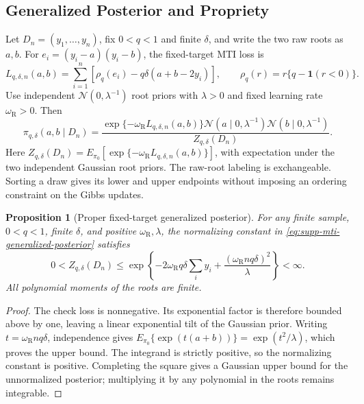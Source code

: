 \documentclass[11pt]{article}
\newcommand{\Normal}{\mathcal{N}}
\newcommand{\ind}{\mathbf{1}}
\newtheorem{proposition}{Proposition}
\begin{document}
\subsection{Generalized Posterior and Propriety}
\label{sec:supp-mti-posterior}

Let \(D_n=(y_1,\ldots,y_n)\), fix \(0<q<1\) and finite \(\delta\), and
write the two raw roots as \(a,b\). For \(e_i=(y_i-a)(y_i-b)\), the
fixed-target MTI loss is
\begin{equation}
L_{q,\delta,n}(a,b)
=\sum_{i=1}^n\left[
\rho_q(e_i)-q\delta(a+b-2y_i)
\right],
\qquad
\rho_q(r)=r\{q-\ind(r<0)\}.
\label{eq:supp-mti-computational-loss}
\end{equation}
Use independent \(\Normal(0,\lambda^{-1})\) root priors with
\(\lambda>0\) and fixed learning rate \(\omega_{\mathrm R}>0\). Then
\begin{equation}
\pi_{q,\delta}(a,b\mid D_n)
=\frac{\exp\{-\omega_{\mathrm R}L_{q,\delta,n}(a,b)\}
\Normal(a\mid0,\lambda^{-1})\Normal(b\mid0,\lambda^{-1})}
{Z_{q,\delta}(D_n)}.
\label{eq:supp-mti-generalized-posterior}
\end{equation}
Here \(Z_{q,\delta}(D_n)=E_{\pi_0}
[\exp\{-\omega_{\mathrm R}L_{q,\delta,n}(a,b)\}]\), with expectation under
the two independent Gaussian root priors.
The raw-root labeling is exchangeable. Sorting a draw gives its lower and
upper endpoints without imposing an ordering constraint on the Gibbs updates.

\begin{proposition}[Proper fixed-target generalized posterior]
\label{prop:supp-mti-posterior-proper}
For any finite sample, \(0<q<1\), finite \(\delta\), and positive
\(\omega_{\mathrm R},\lambda\), the normalizing constant in
\eqref{eq:supp-mti-generalized-posterior} satisfies
\[
0<Z_{q,\delta}(D_n)
\le\exp\left\{-2\omega_{\mathrm R}q\delta\sum_i y_i
+\frac{(\omega_{\mathrm R}nq\delta)^2}{\lambda}\right\}<\infty.
\]
All polynomial moments of the roots are finite.
\end{proposition}

\begin{proof}
The check loss is nonnegative. Its exponential factor is therefore bounded
above by one, leaving a linear exponential tilt of the Gaussian prior.
Writing \(t=\omega_{\mathrm R}nq\delta\), independence gives
\(E_{\pi_0}\{\exp(t(a+b))\}=\exp(t^2/\lambda)\), which proves the upper
bound. The integrand is strictly positive, so the normalizing constant is
positive. Completing the square gives a Gaussian upper bound for the
unnormalized posterior; multiplying it by any polynomial in the roots remains
integrable.
\end{proof}
\end{document}

